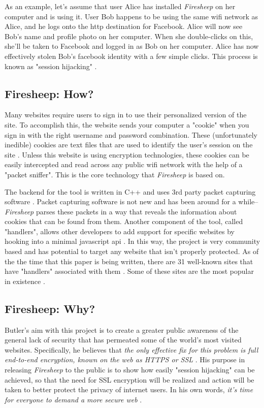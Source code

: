 \documentclass[11pt]{article}
\begin{document}
\begin{multicols}{2}
As an example, let's assume that user Alice has installed \emph{Firesheep} on her computer and is using it. User Bob happens to be using the same wifi network as Alice, and he logs onto the http destination for Facebook. Alice will now see Bob's name and profile photo on her computer. When she double-clicks on this, she'll be taken to Facebook and logged in as Bob on her computer. Alice has now effectively stolen Bob's facebook identity with a few simple clicks. This process is known as "session hijacking" \cite{hijacking}.

\subsection{Firesheep: How?}
Many websites require users to sign in to use their personalized version of the site. To accomplish this, the website sends your computer a "cookie" when you sign in with the right username and password combination. These (unfortunately inedible) cookies are text files that are used to identify the user's session on the site \cite{codebutler_main}. Unless this website is using encryption technologies, these cookies can be easily intercepted and read across any public wifi network with the help of a "packet sniffer". This is the core technology that \emph{Firesheep} is based on.

The backend for the tool is written in C++ and uses 3rd party packet capturing software \cite{github}. Packet capturing software is not new and has been around for a while--\emph{Firesheep} parses these packets in a way that reveals the information about cookies that can be found from them. Another component of the tool, called "handlers", allows other developers to add support for specific websites by hooking into a minimal javascript api \cite{github}. In this way, the project is very community based and has potential to target any website that isn't properly protected. As of the the time that this paper is being written, there are 31 well-known sites that have "handlers" associated with them \cite{github}. Some of these sites are the most popular in existence \cite{alexa}.

\subsection{Firesheep: Why?}
Butler's aim with this project is to create a greater public awareness of the general lack of security that has permeated some of the world's most visited websites. Specifically, he believes that \emph{the only effective fix for this problem is full end-to-end encryption, known on the web as HTTPS or SSL} \cite{codebutler_main}. His purpose in releasing \emph{Firesheep} to the public is to show how easily "session hijacking" can be achieved, so that the need for SSL encryption will be realized and action will be taken to better protect the privacy of internet users. In his own words, \emph{it's time for everyone to demand a more secure web} \cite{codebutler_main}.


\end{multicols}
\end{document}
